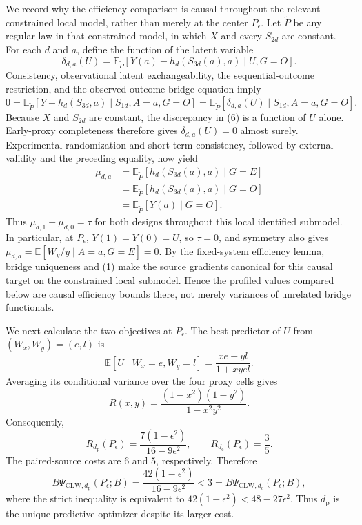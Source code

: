 We record why the efficiency comparison is causal throughout the relevant constrained local model, rather than merely at the center \(P_\epsilon\). Let \(\widetilde P\) be any regular law in that constrained model, in which \(X\) and every \(S_{2d}\) are constant. For each \(d\) and \(a\), define the function of the latent variable
\[
 \delta_{d,a}(U)
 =\mathbb E_{\widetilde P}\!\left[
 Y(a)-h_d(S_{3d}(a),a)\mid U,G=O
 \right].
\]
Consistency, observational latent exchangeability, the sequential-outcome restriction, and the observed outcome-bridge equation imply
\[
 0
 =\mathbb E_{\widetilde P}\!\left[
 Y-h_d(S_{3d},a)\mid S_{1d},A=a,G=O
 \right]
 =\mathbb E_{\widetilde P}\!\left[
 \delta_{d,a}(U)\mid S_{1d},A=a,G=O
 \right]. \tag{6}
\]
Because \(X\) and \(S_{2d}\) are constant, the discrepancy in (6) is a function of \(U\) alone. Early-proxy completeness therefore gives \(\delta_{d,a}(U)=0\) almost surely. Experimental randomization and short-term consistency, followed by external validity and the preceding equality, now yield
\[
 \begin{aligned}
 \mu_{d,a}
 &=\mathbb E_{\widetilde P}[h_d(S_{3d}(a),a)\mid G=E]\\
 &=\mathbb E_{\widetilde P}[h_d(S_{3d}(a),a)\mid G=O]\\
 &=\mathbb E_{\widetilde P}[Y(a)\mid G=O].
 \end{aligned} \tag{7}
\]
Thus \(\mu_{d,1}-\mu_{d,0}=\tau\) for both designs throughout this local identified submodel. In particular, at \(P_\epsilon\), \(Y(1)=Y(0)=U\), so \(\tau=0\), and symmetry also gives \(\mu_{d,a}=\mathbb E[W_y/y\mid A=a,G=E]=0\). By the fixed-system efficiency lemma, bridge uniqueness and (1) make the source gradients canonical for this causal target on the constrained local submodel. Hence the profiled values compared below are causal efficiency bounds there, not merely variances of unrelated bridge functionals.

We next calculate the two objectives at \(P_\epsilon\). The best predictor of \(U\) from \((W_x,W_y)=(e,l)\) is
\[
 \mathbb E[U\mid W_x=e,W_y=l]
 =\frac{xe+yl}{1+xyel}.
\]
Averaging its conditional variance over the four proxy cells gives
\[
 R(x,y)=\frac{(1-x^2)(1-y^2)}{1-x^2y^2}. \tag{8}
\]
Consequently,
\[
 R_{d_{\mathrm p}}(P_\epsilon)
 =\frac{7(1-\epsilon^2)}{16-9\epsilon^2},
 \qquad
 R_{d_{\mathrm e}}(P_\epsilon)=\frac35. \tag{9}
\]
The paired-source costs are \(6\) and \(5\), respectively. Therefore
\[
 B\Psi_{\mathrm{CLW},d_{\mathrm p}}(P_\epsilon;B)
 =\frac{42(1-\epsilon^2)}{16-9\epsilon^2}
 <3
 =B\Psi_{\mathrm{CLW},d_{\mathrm e}}(P_\epsilon;B), \tag{10}
\]
where the strict inequality is equivalent to \(42(1-\epsilon^2)<48-27\epsilon^2\). Thus \(d_{\mathrm p}\) is the unique predictive optimizer despite its larger cost.

